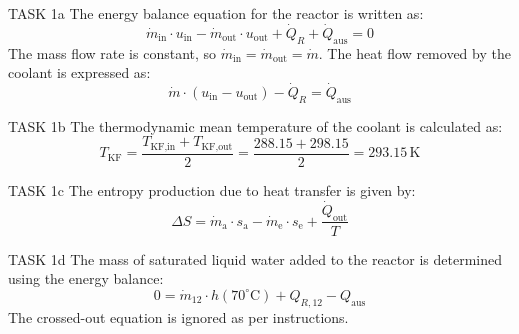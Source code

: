 TASK 1a  
The energy balance equation for the reactor is written as:  
\[
\dot{m}_{\text{in}} \cdot u_{\text{in}} - \dot{m}_{\text{out}} \cdot u_{\text{out}} + \dot{Q}_R + \dot{Q}_{\text{aus}} = 0
\]  
The mass flow rate is constant, so \( \dot{m}_{\text{in}} = \dot{m}_{\text{out}} = \dot{m} \). The heat flow removed by the coolant is expressed as:  
\[
\dot{m} \cdot \left( u_{\text{in}} - u_{\text{out}} \right) - \dot{Q}_R = \dot{Q}_{\text{aus}}
\]  

TASK 1b  
The thermodynamic mean temperature of the coolant is calculated as:  
\[
T_{\text{KF}} = \frac{T_{\text{KF,in}} + T_{\text{KF,out}}}{2} = \frac{288.15 + 298.15}{2} = 293.15 \, \text{K}
\]  

TASK 1c  
The entropy production due to heat transfer is given by:  
\[
\Delta S = \dot{m}_{\text{a}} \cdot s_{\text{a}} - \dot{m}_{\text{e}} \cdot s_{\text{e}} + \frac{\dot{Q}_{\text{out}}}{T}
\]  

TASK 1d  
The mass of saturated liquid water added to the reactor is determined using the energy balance:  
\[
0 = \dot{m}_{12} \cdot h(70^\circ\text{C}) + Q_{R,12} - Q_{\text{aus}}
\]  
The crossed-out equation is ignored as per instructions.